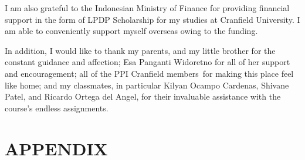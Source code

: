 \documentclass[12pt]{article}
\begin{document}
I am also grateful to the Indonesian Ministry of Finance for providing financial support in the form of LPDP Scholarship for my studies at Cranfield University. I am able to conveniently support myself overseas owing to the funding.

In addition, I would like to thank my parents, and my little brother for the constant guidance and affection; Esa Panganti Widoretno for all of her support and encouragement; all of the PPI Cranfield members for making this place feel like home; and my classmates, in particular Kilyan Ocampo Cardenas, Shivane Patel, and Ricardo Ortega del Angel, for their invaluable assistance with the course's endless assignments.






\clearpage
{
  \hypersetup{linkcolor=black}
  \pagestyle{fancy}
    \fancyhead[L]{}
  \tableofcontents
  \clearpage
    \pagestyle{fancy}
    \fancyhead[L]{}
  \listoffigures
  \clearpage
    \pagestyle{fancy}
    \fancyhead[L]{}
  \listoftables
}











\newpage
{}
\setcounter{page}{1}


\sloppy
\pagestyle{fancy}
\lhead{\small{}}


\clearpage
\pagestyle{fancy}
\lhead{\small{}}

\clearpage
\pagestyle{fancy}
\lhead{\small{}}

\clearpage
\pagestyle{fancy}
\lhead{\small{}}

\clearpage
\pagestyle{fancy}
\lhead{\small{}}

%
\clearpage
{}
\pagestyle{fancy}
\lhead{\small{}}
\printbibliography[heading=bibintoc,title={References}]
\clearpage
{}
\pagestyle{fancy}
\lhead{\small{}}
\section*{APPENDIX}
\appendix

\end{document}
